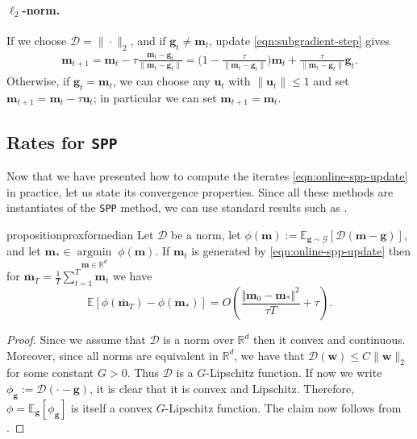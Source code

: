\documentclass[10pt]{article} %
\renewcommand{\vec}[1]{\bm{#1}}
\newcommand{\bg}{\bm{g}}
\DeclareMathOperator{\argmininn}{argmin}
\newcommand{\argmin}[1]{ \underset{#1}{\argmininn} \;}
\newcommand{\R}{\mathbb{R}}
\newcommand{\EE}[2]{\mathbb{E}_{#1}\left[#2\right] }
\newcommand{\norm}[1]{ \|#1 \|}
\newcommand{\dist}{\mathcal{D}}
\let\temp\phi
\let\phi\varphi
\let\varphi\temp
\newcommand{\SPP}{\texttt{SPP}}
\begin{document}
\paragraph{$\ell_2$-norm.} If we choose $\dist= \|\cdot\|_2$, and if $\vec{g}_t \neq \vec{m}_t$, update \eqref{eqn:subgradient-step} gives
    \begin{align*}
        \vec{m}_{t+1} = \vec{m}_t - 
            \tau\frac{\vec{m}_t-\vec{g}_t}{\|\vec{m}_t-\vec{g}_t\|} = \big(1-\frac{\tau}{\|\vec{m}_t-\vec{g}_t\|}\big)\vec{m}_t + \frac{\tau}{\|\vec{m}_t-\vec{g}_t\|} \vec{g}_t.
    \end{align*}
    Otherwise, if $\vec{g}_t = \vec{m}_t$, we can choose any $\vec{u}_t$ with $\|\vec{u}_t\|\leq 1$ and set $\vec{m}_{t+1} = \vec{m}_t - \tau \vec{u}_t$; in particular we can set $\vec{m}_{t+1} = \vec{m}_t$.


\subsection{Rates for \SPP{}}

Now that we have presented how to compute the iterates \eqref{eqn:online-spp-update} in practice, let us state its convergence properties. Since all these methods are instantiates of the \SPP{} method, we can use standard results such as \citet[Thm.\ 4.4]{Davis2019}.

\begin{restatable}{proposition}{proxformedian}
\label{prop:prox for computing median}
    Let $\dist$ be a norm, let $\varphi(\vec{m}) := \EE{\vec{g}\sim \mathcal{G}}{ \dist(\vec{m}- \vec{g})}$, and let $\vec{m}_* \in \argmin{\vec{m}\in \R^d} \varphi(\vec{m})$. 
    If $\vec{m}_t$ is generated by \eqref{eqn:online-spp-update}
    then for $\bar{\vec{m}}_T = \frac{1}{T}\sum_{t=1}^T \vec{m}_t$ we have
    \begin{equation*}
        \mathbb{E}\left[ \varphi(\bar{\vec{m}}_T) - \varphi(\vec{m}_*) \right] = O \left( \frac{\Vert \vec{m}_0 - \vec{m}_* \Vert^2}{\tau T} + \tau \right).
    \end{equation*}
\end{restatable}
%
\begin{proof}
    Since we assume that $\dist$ is a norm over $\R^d$ then it convex and continuous. 
    Moreover, since all norms are equivalent in $\mathbb{R}^d$, we have that $\dist(\vec{w}) \leq C \norm{\vec{w}}_2$ for some constant $G>0$. Thus $\dist$ is a $G$-Lipschitz function. 
    If now we write $\varphi_{\bg} := \mathcal{D}( \cdot - \bg)$, it is clear that it is convex and Lipschitz.
    Therefore, $\varphi = \EE{\bg}{\varphi_{\bg}}$ is itself a convex $G$-Lipschitz function.
    The claim now follows from \citet[Theorem 4.4]{Davis2019}.
\end{proof}
\end{document}

